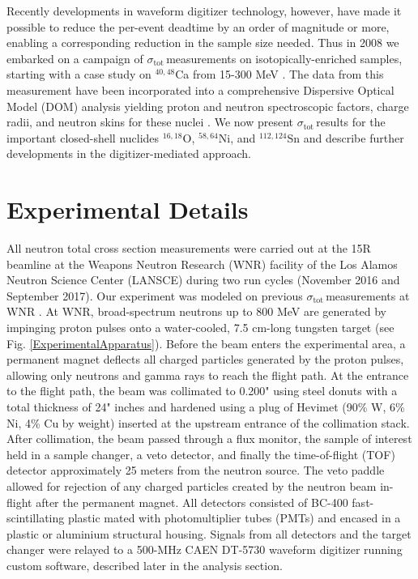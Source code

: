 \documentclass[twocolumn,secnumarabic,amssymb, nobibnotes, aps, prl,
superscriptaddress, nobalancelastpage]{revtex4}
\newcommand{\tots}{\ensuremath{\sigma_{\text{tot}}\,}}
\begin{document}
Recently developments in waveform digitizer technology, however, have made it
possible to reduce the per-event deadtime by an order of magnitude or more,
enabling a corresponding reduction in the sample size needed. Thus in 2008 we
embarked on a campaign of \tots measurements
on isotopically-enriched samples, starting with a case study on $^{40,48}$Ca
from 15-300 MeV \cite{Shane2010}. The data from this measurement have been 
incorporated into a 
comprehensive Dispersive Optical Model (DOM) analysis \cite{DOMPapers} yielding 
proton and neutron spectroscopic factors, charge radii, and neutron
skins for these nuclei \cite{NeutronSkinCa48}. We now present \tots results for
the important closed-shell nuclides $^{16,18}$O, $^{58,64}$Ni, and
$^{112,124}$Sn and describe further developments in the digitizer-mediated
approach.

\section{Experimental Details}
All neutron total cross section measurements were carried out at the 15R
beamline at the Weapons Neutron Research (WNR) facility of the Los Alamos
Neutron Science Center (LANSCE) during two run cycles (November 2016 and
September 2017). Our experiment was modeled on previous \tots measurements at WNR
\cite{Finlay1993,Abfalterer2001,Shane2010}. At WNR, broad-spectrum 
neutrons up
to 800 MeV are generated by impinging proton pulses onto a water-cooled, 7.5
cm-long tungsten target (see Fig. \ref{ExperimentalApparatus}). Before the beam
enters the experimental area, a
permanent magnet deflects all charged particles generated by the proton pulses, 
allowing only neutrons and gamma rays to reach the flight path. At the
entrance to the flight path, the beam was collimated to 0.200" using steel
donuts with a total thickness of 24" inches and hardened using a plug of Hevimet (90\% W, 6\% Ni, 4\% Cu by weight) 
inserted at the upstream entrance of the
collimation stack. After collimation, the beam passed through a flux 
monitor, the sample of interest held in a sample changer, a veto detector, and finally
the time-of-flight (TOF) detector approximately 25 meters from the neutron
source. The veto paddle allowed for rejection of any charged particles created
by the neutron beam in-flight after the permanent magnet.
All detectors consisted of BC-400 fast-scintillating plastic mated with 
photomultiplier tubes (PMTs) and encased in a plastic or
aluminium structural housing. Signals from all detectors and
the target changer were relayed to a 500-MHz CAEN DT-5730 waveform digitizer
running custom software, described later in the analysis section.
\end{document}
